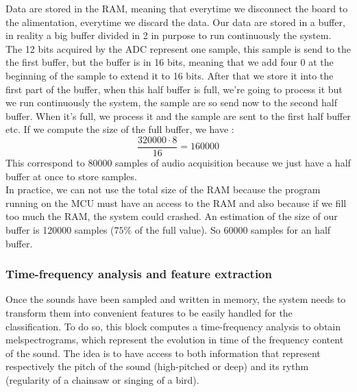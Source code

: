 \documentclass{article}
\begin{document}
Data are stored in the RAM, meaning that everytime we disconnect the board to the alimentation, everytime we discard the data. Our data are stored in a buffer, in reality a big buffer divided in 2 in purpose to run continuously the system. The 12 bits acquired by the ADC represent one sample, this sample is send to the the first buffer, but the buffer is in 16 bits, meaning that we add four 0 at the beginning of the sample to extend it to 16 bits. After that we store it into the first part of the buffer, when this half buffer is full, we're going to process it but we run continuously the system, the sample are so send now to the second half buffer. When it's full, we process it and the sample are sent to the first half buffer etc. If we compute the size of the full buffer, we have :
\begin{equation}
    \frac{320000\cdot 8}{16} = 160000
\end{equation}
This correspond to 80000 samples of audio acquisition because we just have a half buffer at once to store samples.\\
In practice, we can not use the total size of the RAM because the program running on the MCU must have an access to the RAM and also because if we fill too much the RAM, the system could crashed. An estimation of the size of our buffer is 120000 samples ($75 \%$ of the full value). So 60000 samples for an half buffer.


\subsubsection{Time-frequency analysis and feature extraction}

Once the sounds have been sampled and written in memory, the system needs to transform them into convenient features to be easily handled for the classification. To do so, 
this block computes a time-frequency analysis to obtain melspectrograms, which represent the evolution in time of the frequency content of the sound. The idea is to have access to both information that represent respectively the pitch of the sound (high-pitched or deep) and its rythm (regularity of a chainsaw or singing of a bird). \\
\end{document}

